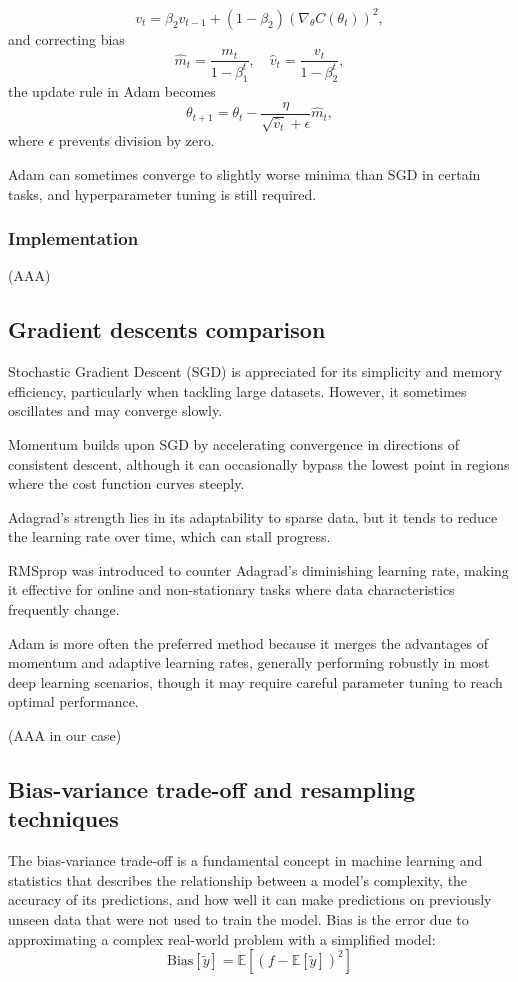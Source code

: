 \documentclass[
 reprint,            %
 amsmath,amssymb,
 aps,
]{revtex4-2}
\begin{document}
\[
v_t = \beta_2 v_{t-1} + (1-\beta_2) (\nabla_\theta C(\theta_t))^2,
\]  
and correcting bias
\[
\hat{m}_t = \frac{m_t}{1-\beta_1^t}, \quad \hat{v}_t = \frac{v_t}{1-\beta_2^t},
\]  
the update rule in Adam becomes
\[
\theta_{t+1} = \theta_t - \frac{\eta}{\sqrt{\hat{v}_t}+\epsilon} \hat{m}_t,
\]  
where \(\epsilon\) prevents division by zero.

Adam can sometimes converge to slightly worse minima than SGD in certain tasks, and hyperparameter tuning is still required.
\subsubsection{Implementation}
(AAA)

\subsection{Gradient descents comparison}
Stochastic Gradient Descent (SGD) is appreciated for its simplicity and memory efficiency, particularly when tackling large datasets. However, it sometimes oscillates and may converge slowly. 

Momentum builds upon SGD by accelerating convergence in directions of consistent descent, although it can occasionally bypass the lowest point in regions where the cost function curves steeply. 

Adagrad's strength lies in its adaptability to sparse data, but it tends to reduce the learning rate over time, which can stall progress. 

RMSprop was introduced to counter Adagrad's diminishing learning rate, making it effective for online and non-stationary tasks where data characteristics frequently change. 

Adam is more often the preferred method because it merges the advantages of momentum and adaptive learning rates, generally performing robustly in most deep learning scenarios, though it may require careful parameter tuning to reach optimal performance.

(AAA in our case)

\subsection{Bias-variance trade-off and resampling techniques}

The bias-variance trade-off is a fundamental concept in machine learning and statistics that describes the relationship between a model's complexity, the accuracy of its predictions, and how well it can make predictions on previously unseen data that were not used to train the model. 
Bias is the error due to approximating a complex real-world problem with a simplified model: 
$$\mathrm{Bias}[\tilde y]= \mathbb{E}[(f-\mathbb{E}[\tilde y])^2]$$
\end{document}
